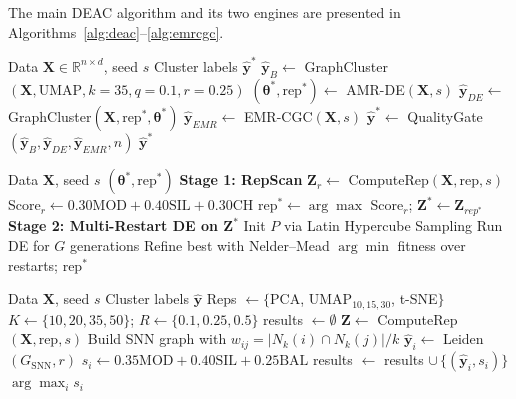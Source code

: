 \documentclass[conference]{IEEEtran}
\begin{document}
The main DEAC algorithm and its two engines are presented in Algorithms~\ref{alg:deac}--\ref{alg:emrcgc}.

\begin{algorithm}[!t]
\caption{DEAC --- Main Algorithm}
\label{alg:deac}
\begin{algorithmic}[1]
\REQUIRE Data $\mathbf{X} \in \mathbb{R}^{n \times d}$, seed $s$
\ENSURE Cluster labels $\hat{\mathbf{y}}^*$
\STATE $\hat{\mathbf{y}}_B \leftarrow$ GraphCluster$(\mathbf{X},\text{UMAP}, k{=}35, q{=}0.1, r{=}0.25)$
\STATE $(\boldsymbol{\theta}^*, \text{rep}^*) \leftarrow$ AMR-DE$(\mathbf{X}, s)$ 
\STATE $\hat{\mathbf{y}}_{DE} \leftarrow$ GraphCluster$(\mathbf{X}, \text{rep}^*, \boldsymbol{\theta}^*)$
\STATE $\hat{\mathbf{y}}_{EMR} \leftarrow$ EMR-CGC$(\mathbf{X}, s)$ 
\STATE $\hat{\mathbf{y}}^* \leftarrow$ QualityGate$(\hat{\mathbf{y}}_B, \hat{\mathbf{y}}_{DE}, \hat{\mathbf{y}}_{EMR}, n)$
\RETURN $\hat{\mathbf{y}}^*$
\end{algorithmic}
\end{algorithm}

\begin{algorithm}[!t]
\caption{AMR-DE --- Engine 1}
\label{alg:amrde}
\begin{algorithmic}[1]
\REQUIRE Data $\mathbf{X}$, seed $s$
\ENSURE $(\boldsymbol{\theta}^*, \text{rep}^*)$
\STATE \textbf{Stage 1: RepScan}
  \STATE $\mathbf{Z}_r \leftarrow$ ComputeRep$(\mathbf{X}, \text{rep}, s)$
  \STATE Score$_r \leftarrow 0.30\text{MOD}+0.40\text{SIL}+0.30\text{CH}$
\ENDFOR
\STATE rep$^* \leftarrow \arg\max$ Score$_r$; $\mathbf{Z}^* \leftarrow \mathbf{Z}_{rep^*}$
\STATE \textbf{Stage 2: Multi-Restart DE on $\mathbf{Z}^*$}
  \STATE Init $P$ via Latin Hypercube Sampling
  \STATE Run DE for $G$ generations
  \STATE Refine best with Nelder--Mead
\ENDFOR
\RETURN $\arg\min$ fitness over restarts; rep$^*$
\end{algorithmic}
\end{algorithm}

\begin{algorithm}[!t]
\caption{EMR-CGC --- Engine 2}
\label{alg:emrcgc}
\begin{algorithmic}[1]
\REQUIRE Data $\mathbf{X}$, seed $s$
\ENSURE Cluster labels $\hat{\mathbf{y}}$
\STATE Reps $\leftarrow \{$PCA, UMAP$_{10,15,30}$, t-SNE$\}$
\STATE $K \leftarrow \{10, 20, 35, 50\}$; $R \leftarrow \{0.1, 0.25, 0.5\}$
\STATE results $\leftarrow \emptyset$
  \STATE $\mathbf{Z} \leftarrow$ ComputeRep$(\mathbf{X}, \text{rep}, s)$
    \STATE Build SNN graph with $w_{ij}=|N_k(i)\cap N_k(j)|/k$
    \STATE $\hat{\mathbf{y}}_i \leftarrow$ Leiden$(G_{\text{SNN}}, r)$
    \STATE $s_i \leftarrow 0.35\text{MOD}+0.40\text{SIL}+0.25\text{BAL}$
    \STATE results $\leftarrow$ results $\cup\,\{(\hat{\mathbf{y}}_i, s_i)\}$
  \ENDFOR
\ENDFOR
\RETURN $\arg\max_i s_i$
\end{algorithmic}
\end{algorithm}
\end{document}
